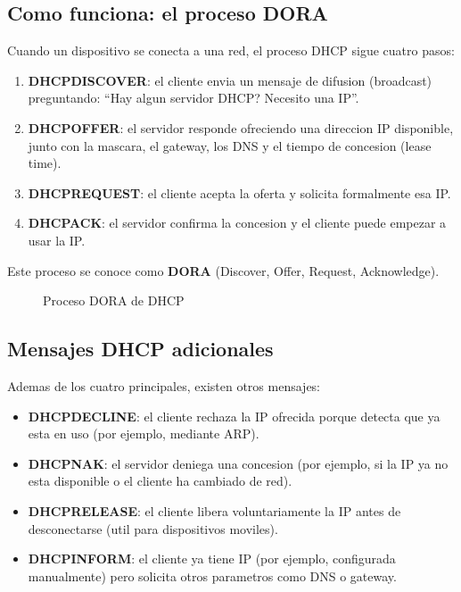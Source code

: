 \subsection{Como funciona: el proceso DORA}

Cuando un dispositivo se conecta a una red, el proceso DHCP sigue cuatro pasos:

\begin{enumerate}
    \item \textbf{DHCPDISCOVER}: el cliente envia un mensaje de difusion (broadcast)
    preguntando: ``Hay algun servidor DHCP? Necesito una IP''.
    \item \textbf{DHCPOFFER}: el servidor responde ofreciendo una direccion IP
    disponible, junto con la mascara, el gateway, los DNS y el tiempo de
    concesion (lease time).
    \item \textbf{DHCPREQUEST}: el cliente acepta la oferta y solicita formalmente
    esa IP.
    \item \textbf{DHCPACK}: el servidor confirma la concesion y el cliente puede
    empezar a usar la IP.
\end{enumerate}

Este proceso se conoce como \textbf{DORA} (Discover, Offer, Request, Acknowledge).

\begin{figure}[H]
\centering
{}
\caption{Proceso DORA de DHCP}
\label{fig:dhcp-dora}
\end{figure}

\subsection{Mensajes DHCP adicionales}

Ademas de los cuatro principales, existen otros mensajes:

\begin{itemize}
    \item \textbf{DHCPDECLINE}: el cliente rechaza la IP ofrecida porque detecta
    que ya esta en uso (por ejemplo, mediante ARP).
    \item \textbf{DHCPNAK}: el servidor deniega una concesion (por ejemplo, si la IP
    ya no esta disponible o el cliente ha cambiado de red).
    \item \textbf{DHCPRELEASE}: el cliente libera voluntariamente la IP antes de
    desconectarse (util para dispositivos moviles).
    \item \textbf{DHCPINFORM}: el cliente ya tiene IP (por ejemplo, configurada
    manualmente) pero solicita otros parametros como DNS o gateway.
\end{itemize}


